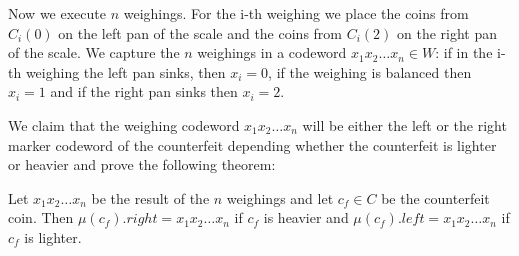 Now we execute $n$ weighings. For the i-th weighing we place the coins from $C_i(0)$ on the left pan of the scale and the coins from $C_i(2)$ on the right pan of the scale. We capture the $n$ weighings in a codeword $x_1 x_2 \ldots x_n \in W$: if in the i-th weighing the left pan sinks, then $x_i=0$, if the weighing is balanced then $x_i=1$ and if the right pan sinks then $x_i=2$. 

We claim that the weighing codeword $x_1 x_2 \ldots x_n$ will be either the left or the right marker codeword of the counterfeit depending whether the counterfeit is lighter or heavier and prove the following theorem:

\begin{thm}\label{coin_encoding}
Let $x_1 x_2 \ldots x_n$ be the result of the $n$ weighings and let $c_f \in C$ be the counterfeit coin.
Then $\mu(c_f).right = x_1 x_2 \ldots x_n$ if $c_f$ is heavier and $\mu(c_f).left = x_1 x_2 \ldots x_n$ if $c_f$ is lighter.
\end{thm}

